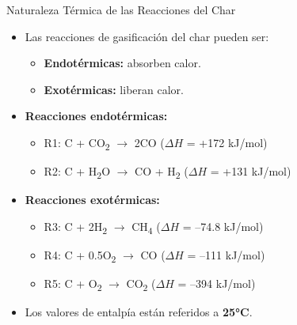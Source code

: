 \documentclass[../../main.tex]{subfiles}
\begin{document}
\begin{frame}{Naturaleza Térmica de las Reacciones del Char}
\small
\begin{itemize}
  \item Las reacciones de gasificación del char pueden ser:
  \begin{itemize}
    \item \textbf{Endotérmicas:} absorben calor.
    \item \textbf{Exotérmicas:} liberan calor.
  \end{itemize}

  \item \textbf{Reacciones endotérmicas:}
  \begin{itemize}
    \item R1: C + CO\textsubscript{2} $\rightarrow$ 2CO \hfill ($\Delta H$ = +172 kJ/mol)
    \item R2: C + H\textsubscript{2}O $\rightarrow$ CO + H\textsubscript{2} \hfill ($\Delta H$ = +131 kJ/mol)
  \end{itemize}

  \item \textbf{Reacciones exotérmicas:}
  \begin{itemize}
    \item R3: C + 2H\textsubscript{2} $\rightarrow$ CH\textsubscript{4} \hfill ($\Delta H$ = –74.8 kJ/mol)
    \item R4: C + 0.5O\textsubscript{2} $\rightarrow$ CO \hfill ($\Delta H$ = –111 kJ/mol)
    \item R5: C + O\textsubscript{2} $\rightarrow$ CO\textsubscript{2} \hfill ($\Delta H$ = –394 kJ/mol)
  \end{itemize}

  \item Los valores de entalpía están referidos a \textbf{25°C}.
\end{itemize}
\end{frame}
\end{document}
